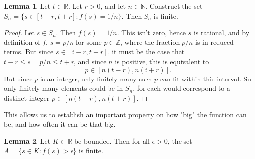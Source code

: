 \documentclass[12pt]{article}
\newcommand{\R}{\mathbb{R}}
\newcommand{\Z}{\mathbb{Z}}
\newcommand{\N}{\mathbb{N}}
\theoremstyle{definition}
\newtheorem{lemma}{Lemma}
\begin{document}
\begin{lemma}
    Let $t\in \R$. Let $r > 0$, and let $ n\in \N $. Construct the set $S_n = \{s\in [t - r, t + r]: f(s) = 1/n\}$. Then $S_n$ is finite.
\end{lemma}

\begin{proof}
    Let $s\in S_n$. Then $ f(s) = 1/n $. This isn't zero, hence $s$ is rational, and by definition of $f$, $s = p/n$ for some $p\in \Z$, where the fraction $p/n$ is in reduced terms. But since $s\in [t - r, t + r]$, it must be the case that $ t - r\le s=p/n\le t + r$, and since $n $ is positive, this is equivalent to 
    \[
        p\in [n(t - r) , n(t + r)].
        \]
    But since $p$ is an integer, only finitely many such $p$ can fit within this interval. So only finitely many elements could be in $S_n$, for each would correspond to a distinct integer $p\in [n(t - r) , n(t + r)]$.
\end{proof}

This allows us to establish an important property on how "big" the function can be, and how often it can be that big. 

\begin{lemma}\label{finitelyManyBig}
    Let $K\subset \R$ be bounded. Then for all $\epsilon > 0$, the set $ A = \{s\in K: f(s) > \epsilon\} $ is finite.
\end{lemma}
\end{document}

